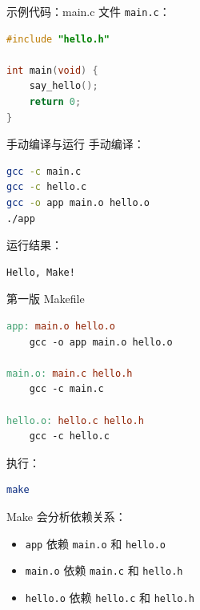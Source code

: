\documentclass[aspectratio=169]{ctexbeamer}
\begin{document}
\begin{frame}[fragile]{示例代码：main.c}
文件 \texttt{main.c}：

\begin{lstlisting}[language=C]
#include "hello.h"

int main(void) {
    say_hello();
    return 0;
}
\end{lstlisting}
\end{frame}

\begin{frame}[fragile]{手动编译与运行}
手动编译：

\begin{lstlisting}[language=bash]
gcc -c main.c
gcc -c hello.c
gcc -o app main.o hello.o
./app
\end{lstlisting}

运行结果：

\begin{lstlisting}[language=bash]
Hello, Make!
\end{lstlisting}
\end{frame}

\begin{frame}{第一版 Makefile}
\begin{lstlisting}[language=make]
app: main.o hello.o
	gcc -o app main.o hello.o

main.o: main.c hello.h
	gcc -c main.c

hello.o: hello.c hello.h
	gcc -c hello.c
\end{lstlisting}

执行：

\begin{lstlisting}[language=bash]
make
\end{lstlisting}

Make 会分析依赖关系：

\begin{itemize}
  \item \texttt{app} 依赖 \texttt{main.o} 和 \texttt{hello.o}
  \item \texttt{main.o} 依赖 \texttt{main.c} 和 \texttt{hello.h}
  \item \texttt{hello.o} 依赖 \texttt{hello.c} 和 \texttt{hello.h}
\end{itemize}
\end{frame}
\end{document}
